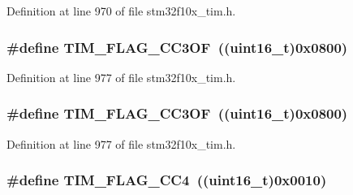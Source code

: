 Definition at line 970 of file stm32f10x\+\_\+tim.\+h.

\subsubsection[{\texorpdfstring{T\+I\+M\+\_\+\+F\+L\+A\+G\+\_\+\+C\+C3\+OF}{TIM_FLAG_CC3OF}}]{\setlength{\rightskip}{0pt plus 5cm}\#define T\+I\+M\+\_\+\+F\+L\+A\+G\+\_\+\+C\+C3\+OF~(({\bf uint16\+\_\+t})0x0800)}\hypertarget{group___t_i_m___flags_gac81f24eaffdf83c2db9d2e6078a00919}{}\label{group___t_i_m___flags_gac81f24eaffdf83c2db9d2e6078a00919}


Definition at line 977 of file stm32f10x\+\_\+tim.\+h.

\subsubsection[{\texorpdfstring{T\+I\+M\+\_\+\+F\+L\+A\+G\+\_\+\+C\+C3\+OF}{TIM_FLAG_CC3OF}}]{\setlength{\rightskip}{0pt plus 5cm}\#define T\+I\+M\+\_\+\+F\+L\+A\+G\+\_\+\+C\+C3\+OF~(({\bf uint16\+\_\+t})0x0800)}\hypertarget{group___t_i_m___flags_gac81f24eaffdf83c2db9d2e6078a00919}{}\label{group___t_i_m___flags_gac81f24eaffdf83c2db9d2e6078a00919}


Definition at line 977 of file stm32f10x\+\_\+tim.\+h.

\subsubsection[{\texorpdfstring{T\+I\+M\+\_\+\+F\+L\+A\+G\+\_\+\+C\+C4}{TIM_FLAG_CC4}}]{\setlength{\rightskip}{0pt plus 5cm}\#define T\+I\+M\+\_\+\+F\+L\+A\+G\+\_\+\+C\+C4~(({\bf uint16\+\_\+t})0x0010)}\hypertarget{group___t_i_m___flags_gafd0dc57b56941f8b8250d66e289542db}{}\label{group___t_i_m___flags_gafd0dc57b56941f8b8250d66e289542db}


